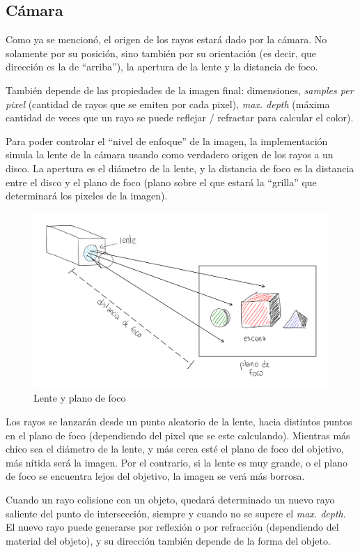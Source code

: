 \subsection{Cámara} \label{ssec:rt-camera}

Como ya se mencionó, el origen de los rayos estará dado por la cámara. No
solamente por su posición, sino también por su orientación (es decir, que
dirección es la de ``arriba''), la apertura de la lente y la distancia de foco.

También depende de las propiedades de la imagen final: dimensiones,
\textit{samples per pixel} (cantidad de rayos que se emiten por cada pixel),
\textit{max. depth} (máxima cantidad de veces que un rayo se puede reflejar /
refractar para calcular el color).

Para poder controlar el ``nivel de enfoque'' de la imagen, la implementación
simula la lente de la cámara usando como verdadero origen de los rayos a un
disco. La apertura es el diámetro de la lente, y la distancia de foco
es la distancia entre el disco y el plano de foco (plano sobre el que estará la
``grilla'' que determinará los pixeles de la imagen).

\begin{figure}[H]
    \centering
    \includegraphics[width=.7\textwidth]{imgs/rt-camera-rays-through-lens.png}
    \caption{Lente y plano de foco}
    \label{fig:rt-camera-plano-foco}
\end{figure}

Los rayos se lanzarán desde un punto aleatorio de la lente, hacia distintos
puntos en el plano de foco (dependiendo del pixel que se este calculando).
Mientras más chico sea el diámetro de la lente, y más cerca esté el plano de
foco del objetivo, más nítida será la imagen. Por el contrario, si la lente es
muy grande, o el plano de foco se encuentra lejos del objetivo, la imagen se
verá más borrosa.

Cuando un rayo colisione con un objeto, quedará determinado un nuevo rayo
saliente del punto de intersección, siempre y cuando no se supere el
\textit{max. depth}. El nuevo rayo puede generarse por reflexión o por
refracción (dependiendo del material del objeto), y su dirección también depende
de la forma del objeto.

